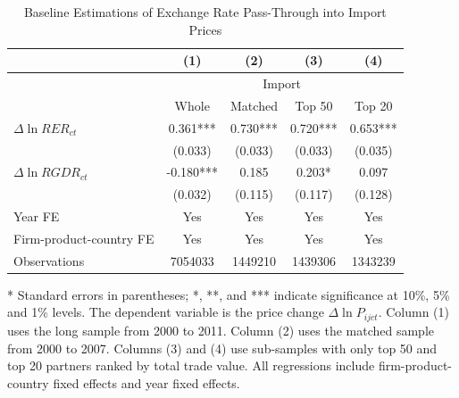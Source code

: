 \documentclass[12pt]{article}
\begin{document}
\begin{table}[htbp]
	\centering
	\caption{Baseline Estimations of Exchange Rate Pass-Through into Import Prices}
	\begin{threeparttable}
		\begin{tabular}{lcccc}
			\toprule
			& (1)   & (2)   & (3)   & (4) \\
			\midrule
			& \multicolumn{4}{c}{Import} \\
			& Whole & Matched & Top 50 & Top 20 \\
			\midrule
			$\Delta \ln RER_{ct}$ & 0.361*** & 0.730*** & 0.720*** & 0.653*** \\
			& (0.033) & (0.033) & (0.033) & (0.035) \\
			$\Delta \ln RGDR_{ct}$ & -0.180*** & 0.185 & 0.203* & 0.097 \\
			& (0.032) & (0.115) & (0.117) & (0.128) \\
			Year FE  & Yes   & Yes   & Yes   & Yes \\
			Firm-product-country FE & Yes   & Yes   & Yes   & Yes \\
			Observations & 7054033 & 1449210 & 1439306 & 1343239 \\
			\bottomrule
		\end{tabular}
		\begin{tablenotes}
			\footnotesize
			\item[*] Standard errors in parentheses; *, **, and *** indicate significance at 10\%, 5\% and 1\% levels. The dependent variable is the price change $\Delta \ln P_{ijct}$. Column (1) uses the long sample from 2000 to 2011. Column (2) uses the matched sample from 2000 to 2007. Columns (3) and (4) use sub-samples with only top 50 and top 20 partners ranked by total trade value. All regressions include firm-product-country fixed effects and year fixed effects. 
		\end{tablenotes}
	\end{threeparttable}
	\label{tab.baseline}
\end{table}
\end{document}
